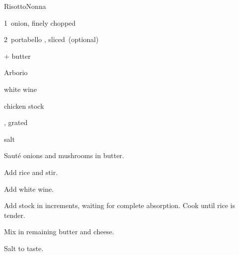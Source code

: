 \begin{recipe}{Risotto}{Nonna}{}

\begin{ingredients}
\item 1~onion, finely chopped
\item 2~portabello , sliced~(optional)
\item {}$+$ butter
\item {} Arborio 
\item {} white wine
\item chicken stock
\item {}, grated
\item salt
\end{ingredients}

\begin{directions}
\item Saut\'e onions and mushrooms in  butter.
\item Add rice and stir.
\item Add white wine.
\item Add stock in \C{\half} increments, waiting for complete absorption. Cook until rice is tender.
\item Mix in remaining butter and cheese.
\item Salt to taste.
\end{directions}

\end{recipe}
